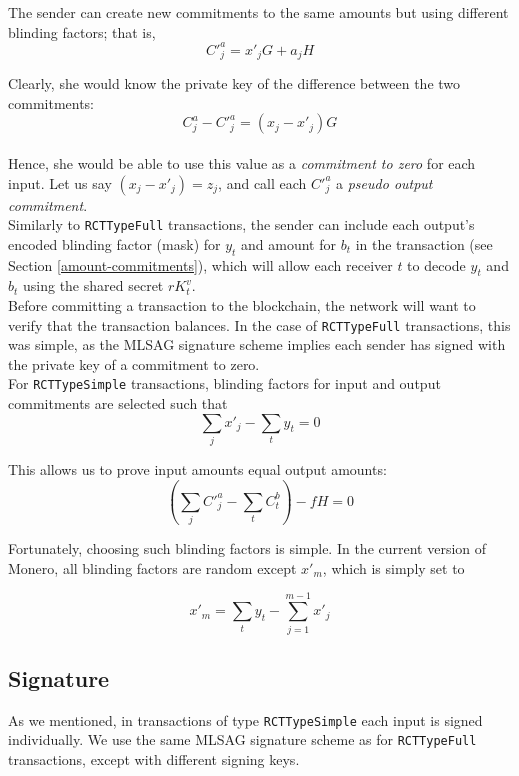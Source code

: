The sender can create new commitments to the same amounts but using different blinding factors; that is,
\[C'^a_{j} = x'_j G + a_j H\]

Clearly, she would know the private key of the difference between the two commitments: \vspace{.3cm}
\[ C^a_{j} - C'^a_{j} = (x_j - x'_j) G \] \\
Hence, she would be able to use this value as a {\em commitment to zero} for each input. Let us say $(x_j - x'_j) = z_j$, and call each $C'^a_j$ a {\em pseudo output commitment}.
\\

Similarly to {\tt RCTTypeFull} transactions, the sender can include each output’s encoded blinding factor (mask) for $y_t$ and amount for $b_t$ in the transaction (see Section \ref{amount-commitments}), which will allow each receiver $t$ to decode $y_t$ and $b_t$ using the shared secret $r K_t^v$.
\\

Before committing a transaction to the blockchain, the network will want to verify that the transaction balances. In the case of {\tt RCTTypeFull} transactions, this was simple, as the MLSAG signature scheme implies each sender has signed with the private key of a commitment to zero.
\\

For {\tt RCTTypeSimple} transactions, blinding factors for input and output commitments are selected such that
\[\sum_j x'_j  - \sum_t y_t = 0  \]

This allows us to prove input amounts equal output amounts:\\
\[ (\sum_j C'^a_{j} - \sum_t C^b_{t}) - f H = 0\]


Fortunately, choosing such blinding factors is simple. In the current version of Monero, all blinding factors are random except $x'_m$, which is simply set to

\[x'_m = \sum_t y_t - \sum_{j=1}^{m-1} x'_j  \]




\subsection{Signature}

As we mentioned, in transactions of type {\tt RCTTypeSimple} each input is signed individually. We use the same MLSAG signature scheme as for {\tt RCTTypeFull} transactions, except with different signing keys.
\\

